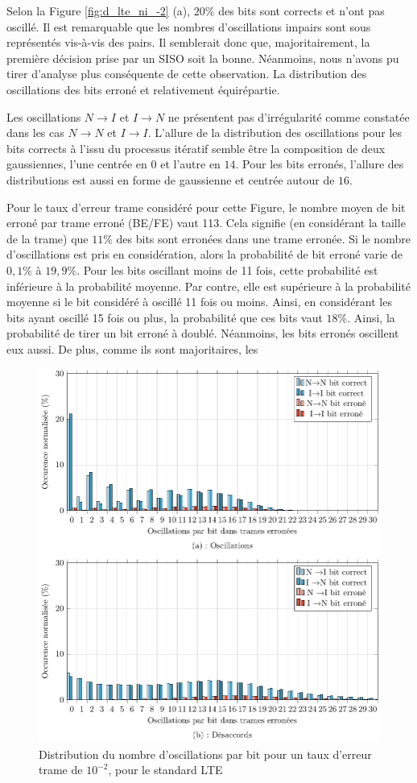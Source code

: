 
Selon la Figure \ref{fig:d_lte_ni_-2} (a), $20\%$ des bits sont corrects et n'ont pas oscillé. Il est remarquable que 
les nombres d'oscillations impairs sont sous représentés vis-à-vis des pairs. Il semblerait donc que, majoritairement, 
la première décision prise par un SISO soit la bonne. Néanmoins, nous n'avons pu tirer d'analyse plus conséquente de 
cette observation. La distribution des oscillations des bits erroné et relativement équirépartie. 

Les oscillations $N\rightarrow I$ et $I\rightarrow N$ ne présentent pas d’irrégularité comme constatée dans les cas 
$N\rightarrow N$ et $I\rightarrow I$. L'allure de la distribution des oscillations pour les bits corrects à l'issu du 
processus itératif semble être la composition de deux gaussiennes, l'une centrée en $0$ et l'autre en $14$. Pour les 
bits erronés, l'allure des distributions est aussi en forme de gaussienne et centrée autour de $16$.

Pour le taux d'erreur trame considéré pour cette Figure, le nombre moyen de bit erroné par trame erroné (BE/FE) vaut 
113. Cela signifie (en considérant la taille de la trame) que $11\%$ des bits sont erronées dans une trame erronée. 
Si le nombre d'oscillations est pris en considération, alors la probabilité de bit erroné varie de $0,1\%$ à $19,9\%$. 
Pour les bits oscillant moins de 11 fois, cette probabilité est inférieure à la probabilité moyenne. Par contre, elle
est supérieure à la probabilité moyenne si le bit considéré à oscillé 11 fois ou moins. Ainsi, en considérant les bits 
ayant oscillé 15 fois ou plus, la probabilité que ces bits vaut $18\%$. Ainsi, la probabilité de tirer un bit erroné à 
doublé. Néanmoins, les bits erronés oscillent eux aussi. De plus, comme ils sont majoritaires, les 

\begin{figure}[!hb]
	\centering
	\includegraphics[]{main/ch2_fig/tikz/d_lte_10-2.pdf}
	\caption{Distribution du nombre d'oscillations par bit pour un taux d'erreur trame de $10^{-2}$, pour le standard LTE \label{fig:d_lte_10-2}}
\end{figure}
